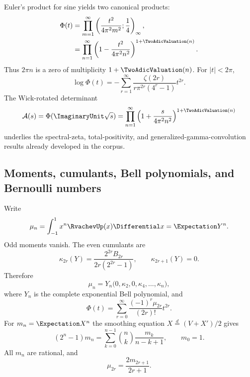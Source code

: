 \documentclass[11pt]{article}
\theoremstyle{definition}
\theoremstyle{remark}
\begin{document}
Euler's product for sine yields two canonical products:
\begin{align}
 \Phi(t)
 &=\prod_{m=1}^\infty
   \left(\frac{t^2}{4\pi^2m^2};\frac14\right)_\infty,
 \label{p3:eq:qpoch-Phi}\\
 &=\prod_{n=1}^\infty
   \left(1-\frac{t^2}{4\pi^2n^2}\right)^{1+\TwoAdicValuation(n)}.
 \label{p3:eq:zero-product}
\end{align}
Thus $2\pi n$ is a zero of multiplicity $1+\TwoAdicValuation(n)$.  For $|t|<2\pi$,
\begin{equation}\label{p3:eq:log-Phi-zeta}
 \log\Phi(t)
 =-\sum_{r=1}^\infty
 \frac{\zeta(2r)}{r\pi^{2r}(4^r-1)}t^{2r}.
\end{equation}
The Wick-rotated determinant
\begin{equation}\label{p3:eq:wick-product}
 \mathcal A(s)=\Phi(\ImaginaryUnit\sqrt{s})
 =\prod_{n=1}^\infty
 \left(1+\frac{s}{4\pi^2n^2}\right)^{1+\TwoAdicValuation(n)}
\end{equation}
underlies the spectral-zeta, total-positivity, and generalized-gamma-convolution
results already developed in the corpus.

\subsection{Moments, cumulants, Bell polynomials, and Bernoulli numbers}

Write
\begin{equation}\label{p3:eq:central-moments}
 \mu_n=\int_{-1}^1x^n\RvachevUp(x)\Differential x=\Expectation Y^n.
\end{equation}
Odd moments vanish.  The even cumulants are
\begin{equation}\label{p3:eq:up-cumulants}
 \kappa_{2r}(Y)=\frac{2^{2r}B_{2r}}{2r(2^{2r}-1)},
 \qquad \kappa_{2r+1}(Y)=0.
\end{equation}
Therefore
\begin{equation}\label{p3:eq:Bell-moments}
 \mu_n=Y_n\bigl(0,\kappa_2,0,\kappa_4,\ldots,\kappa_n\bigr),
\end{equation}
where $Y_n$ is the complete exponential Bell polynomial, and
\begin{equation}\label{p3:eq:Phi-Taylor}
 \Phi(t)=\sum_{r=0}^\infty\frac{(-1)^r\mu_{2r}}{(2r)!}t^{2r}.
\end{equation}
For $m_n=\Expectation X^n$ the smoothing equation
$X\overset d=(V+X')/2$ gives
\begin{equation}\label{p3:eq:Fabius-moment-recurrence}
 (2^n-1)m_n=\sum_{k=0}^{n-1}\binom nk\frac{m_k}{n-k+1},
 \qquad m_0=1.
\end{equation}
All $m_n$ are rational, and
\begin{equation}\label{p3:eq:central-one-sided-moment}
 \mu_{2r}=\frac{2m_{2r+1}}{2r+1}.
\end{equation}
\end{document}
